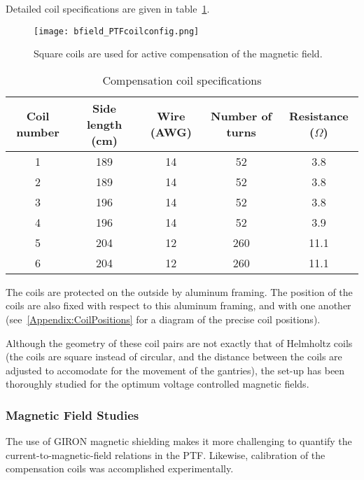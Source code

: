 Detailed coil specifications are given in table~\ref{tab:coil_specs}.
%
\begin{figure}[h]
  \begin{center}
  \texttt{[image: bfield\_PTFcoilconfig.png]}
  \caption{Square coils are used for active compensation of the magnetic field.}
  \label{fig:coils}
  \end{center}
\end{figure}
%
\begin{table}[h]
\begin{center}
  \begin{tabular}{|c|c c c c|}
    \hline
    Coil number & Side length (cm) & Wire (AWG) & Number of turns & Resistance ($\Omega$)\\
    \hline\hline
    1 & 189 & 14 & 52 & 3.8 \\
    2 & 189 & 14 & 52 & 3.8 \\
    3 & 196 & 14 & 52 & 3.8 \\
    4 & 196 & 14 & 52 & 3.9 \\
    5 & 204 & 12 & 260 & 11.1 \\
    6 & 204 & 12 & 260 & 11.1 \\
    \hline
  \end{tabular}
\end{center}
\caption{Compensation coil specifications}
\label{tab:coil_specs}
\end{table}
%
The coils are protected on the outside by aluminum framing. The position of the coils are also fixed with respect to this aluminum framing, and with one another (see~\ref{Appendix:CoilPositions} for a diagram of the precise coil positions).

Although the geometry of these coil pairs are not exactly that of Helmholtz coils (the coils are square instead of circular, and the distance between the coils are adjusted to accomodate for the movement of the gantries), the set-up has been thoroughly studied for the optimum voltage controlled magnetic fields.

\subsubsection{Magnetic Field Studies}

The use of GIRON magnetic shielding makes it more challenging to quantify the current-to-magnetic-field relations in the PTF. Likewise, calibration of the compensation coils was accomplished experimentally.


